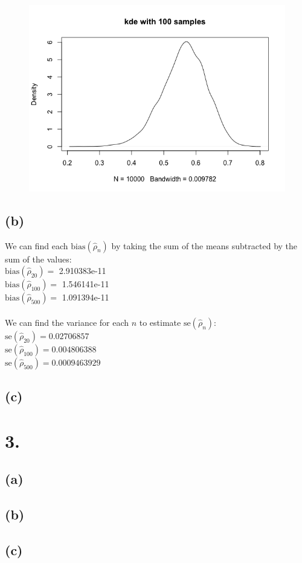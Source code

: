 \documentclass{article}
\begin{document}
{\begin{figure}[t!]
\end{figure}
\begin{figure}[t!]
  \centering
  \includegraphics[width=450pt]{hw5_2a_100.png}
\end{figure}
\newpage

\subsection*{(b)}

We can find each $\text{bias}(\hat{\rho}_n)$ by taking the sum of the means subtracted by the sum of the values: \\
$\text{bias}(\hat{\rho}_{20}) = 
$ 2.910383e-11 \\
$\text{bias}(\hat{\rho}_{100}) = $ 1.546141e-11 \\
$\text{bias}(\hat{\rho}_{500}) = $ 1.091394e-11 \\ \\
We can find the variance for each $n$ to estimate $\text{se}(\hat{\rho}_n)$: \\
$\text{se}(\hat{\rho}_{20}) = 0.02706857$ \\
$\text{se}(\hat{\rho}_{100}) = 0.004806388$ \\
$\text{se}(\hat{\rho}_{500}) = 0.0009463929$

\subsection*{(c)}


}

\section*{3.}
{\Large

\subsection*{(a)}



\subsection*{(b)}



\subsection*{(c)}


}
\end{document}
